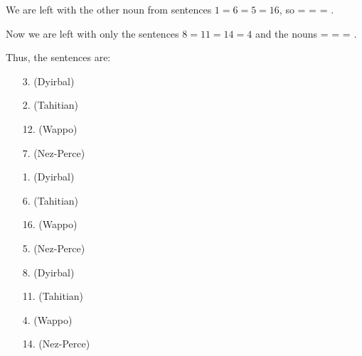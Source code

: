 \begin{refsection}
\begin{mysolution}
\begin{description}[labelwidth=\widthof{\bfseries Step 3.},leftmargin=!]
We are left with the other noun from sentences $1=6=5=16$, so  =  =  = .

Now we are left with only the sentences $8 = 11 = 14 = 4$ and the nouns  =  =  = .

Thus, the sentences are:

    \begin{description}[font=\normalfont]
    \item[Sentence A:]
    \begin{enumerate}
      \item[]
        \item[3.]  \hfill(Dyirbal) 
        \item[2.]  \hfill(Tahitian)
        \item[12.]  \hfill(Wappo)
        \item[7.]  \hfill(Nez-Perce)
    \end{enumerate}
    \item[Sentence B:]
    \begin{enumerate}
        \item[]
        \item[1.]  \hfill(Dyirbal)
        \item[6.]  \hfill(Tahitian)
        \item[16.]  \hfill(Wappo)
        \item[5.]  \hfill(Nez-Perce)
    \end{enumerate}
    \item[Sentence C:]
    \begin{enumerate}
        \item[]
        \item[8.]  \hfill(Dyirbal)
        \item[11.]  \hfill(Tahitian)
        \item[4.]  \hfill(Wappo)
        \item[14.]  \hfill(Nez-Perce)
    \end{enumerate}
    \item[Sentence D:]

\end{description}
\end{description}
\end{mysolution}
\end{refsection}
